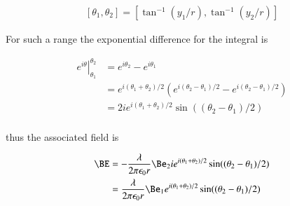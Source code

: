 \documentclass{article}
\begin{document}
\begin{align*}
[\theta_1, \theta_2] = [\tan^{-1}(y_1/r), \tan^{-1}(y_2/r)]
\end{align*}

For such a range the exponential difference for the integral is

\begin{align*}
\left. e^{i\theta} \right \vert_{\theta_1}^{\theta_2} 
&= e^{i\theta_2} - e^{i\theta_1} \\
&= e^{i(\theta_1 + \theta_2)/2} \left( e^{i(\theta_2 - \theta_1)/2} -e^{i(\theta_2 - \theta_1)/2} \right) \\
&= 2 i e^{i(\theta_1 + \theta_2)/2} \sin((\theta_2 - \theta_1)/2) \\
\end{align*}

thus the associated field is

\begin{align*}
\BE 
&= -\frac{\lambda} {2 \pi \epsilon_0 r} \Be_2 i e^{i(\theta_1 + \theta_2)/2} \sin((\theta_2 - \theta_1)/2) \\
&= \frac{\lambda} {2 \pi \epsilon_0 r} \Be_1 e^{i(\theta_1 + \theta_2)/2} \sin((\theta_2 - \theta_1)/2) \\
\end{align*}



\end{document}
